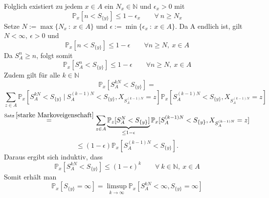 \begin{itemize}
\begin{equation*}
\end{equation*}
Folglich existiert zu jedem $x \in A$ ein $N_{x} \in \mathbb{N}$ und $\epsilon_{x} > 0$ mit 
\begin{equation*}
\mathbb{P}_{x}[n < S_{\lbrace y \rbrace}] \leq 1 - \epsilon_{x} \qquad \forall \: n \geq N_{x}
\end{equation*}
Setze $N := \max \lbrace N_{x} \: : \: x \in A \rbrace$ und $\epsilon := \min \lbrace \epsilon_{x} \: : \: x \in A \rbrace$. Da A endlich ist, gilt $N < \infty, \: \epsilon > 0 $ und
\begin{equation*}
\mathbb{P}_{x}[n < S_{\lbrace y \rbrace}] \leq 1 - \epsilon \qquad \forall n \geq N, \: x \in A
\end{equation*}
Da $S_{A}^{n} \geq n$, folgt somit
\begin{equation*}
\mathbb{P}_{x}[S_{A}^{n} < S_{\lbrace y \rbrace}] \leq 1 - \epsilon \qquad \forall n \geq N, \: x \in A
\end{equation*}
Zudem gilt für alle $k \in \mathbb{N}$
\begin{equation*}
\mathbb{P}_{x}[S_{A}^{kN} < S_{\lbrace y \rbrace}] = 
\end{equation*}
\begin{equation*}
\sum_{z \in A} \mathbb{P}_{x}[S_{A}^{kN} < S_{\lbrace y \rbrace} \: | \: S_{A}^{(k-1)N} < S_{\lbrace y \rbrace}, X_{S_{A}^{(k-1)N}} = z] \mathbb{P}_{x}[ S_{A}^{(k-1)N} < S_{\lbrace y \rbrace}, X_{S_{A}^{(k-1)N}} = z]
\end{equation*}
\begin{equation*}
\stackrel{\mathrm{Satz} \: \ref{starke Markoveigenschaft}}{=} \sum_{z \in A} \underbrace{\mathbb{P}_{z}[S_{A}^{N} < S_{\lbrace y \rbrace}]}_{\leq 1-\epsilon} \mathbb{P}_{x}[ S_{A}^{(k-1)N} < S_{\lbrace y \rbrace}, X_{S_{A}^{(k-1)N}} = z]
\end{equation*}
\begin{equation*}
\leq (1- \epsilon)\mathbb{P}_{x}[ S_{A}^{(k-1)N} < S_{\lbrace y \rbrace}].
\end{equation*}
Daraus ergibt sich induktiv, dass
\begin{equation*}
\mathbb{P}_{x}[S_{A}^{kN} < S_{\lbrace y \rbrace}] \leq (1- \epsilon)^{k} \qquad \forall \: k \in \mathbb{N}, \: x \in A
\end{equation*}
Somit erhält man 
\begin{equation*}
\mathbb{P}_{x}[S_{\lbrace y \rbrace} = \infty] = \limsup_{k \to \infty} \mathbb{P}_{x}[S_{A}^{kN} < \infty, S_{\lbrace y \rbrace} = \infty]
\end{equation*}

\end{itemize}
